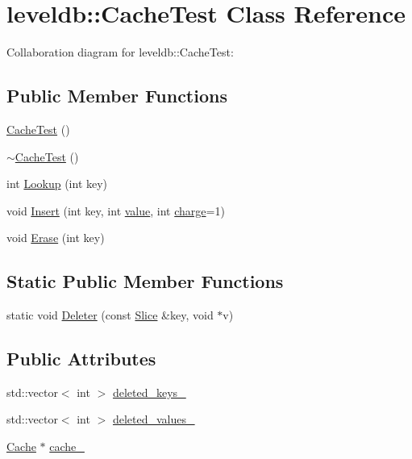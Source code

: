 \hypertarget{classleveldb_1_1_cache_test}{}\section{leveldb\+:\+:Cache\+Test Class Reference}
\label{classleveldb_1_1_cache_test}


Collaboration diagram for leveldb\+:\+:Cache\+Test\+:
\subsection*{Public Member Functions}
\begin{DoxyCompactItemize}
\item 
\hyperlink{classleveldb_1_1_cache_test_abfea0e2ae3ee11b62d1f6b622ef47334}{Cache\+Test} ()
\item 
\hyperlink{classleveldb_1_1_cache_test_a2591fd9f81069e507206aef8f4d91660}{$\sim$\+Cache\+Test} ()
\item 
int \hyperlink{classleveldb_1_1_cache_test_a90d19cd6098f10f809f0c3b94e8b3fc6}{Lookup} (int key)
\item 
void \hyperlink{classleveldb_1_1_cache_test_ad7fc76253a92137e62aede17322c7286}{Insert} (int key, int \hyperlink{cache_8cc_a0f61d63b009d0880a89c843bd50d8d76}{value}, int \hyperlink{cache_8cc_a7476acc4f60747f9d9032e9cbdf5eb79}{charge}=1)
\item 
void \hyperlink{classleveldb_1_1_cache_test_aeaa81bbd9d0fba1fb31b0a8f7aa94397}{Erase} (int key)
\end{DoxyCompactItemize}
\subsection*{Static Public Member Functions}
\begin{DoxyCompactItemize}
\item 
static void \hyperlink{classleveldb_1_1_cache_test_aa8d3ce31a1995da33810f2b5320089ab}{Deleter} (const \hyperlink{classleveldb_1_1_slice}{Slice} \&key, void $\ast$v)
\end{DoxyCompactItemize}
\subsection*{Public Attributes}
\begin{DoxyCompactItemize}
\item 
std\+::vector$<$ int $>$ \hyperlink{classleveldb_1_1_cache_test_aad6b825748f29b973a8934682eb50ed2}{deleted\+\_\+keys\+\_\+}
\item 
std\+::vector$<$ int $>$ \hyperlink{classleveldb_1_1_cache_test_add979edecc72f9740b1d6d4951c13c02}{deleted\+\_\+values\+\_\+}
\item 
\hyperlink{classleveldb_1_1_cache}{Cache} $\ast$ \hyperlink{classleveldb_1_1_cache_test_af2edcc8a47148050ba791f6a2b7a6165}{cache\+\_\+}
\end{DoxyCompactItemize}
